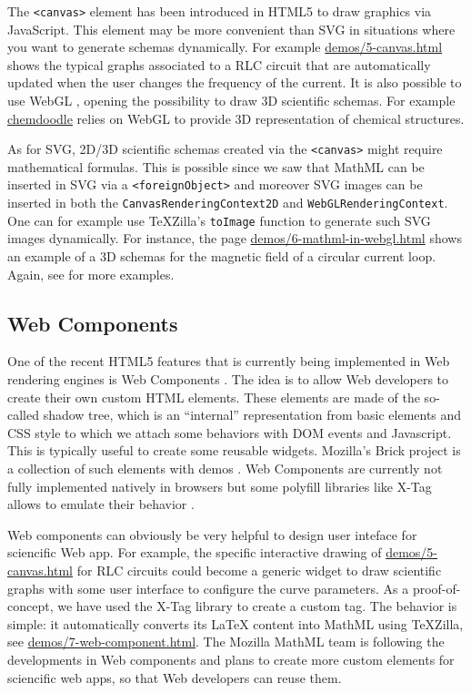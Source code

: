 The {\tt <canvas>} element has been introduced in HTML5 to draw graphics via
JavaScript. This element may be more convenient than SVG in situations where
you want to generate schemas dynamically. For example \href{http://fred-wang.github.io/MathUI2014/demos/5-canvas.html}{demos/5-canvas.html}
shows the typical graphs associated to a RLC circuit that are automatically
updated when the user changes the frequency of the current. It is also possible
to use WebGL \cite{WebGLspec},
opening the possibility to draw 3D scientific schemas. For example
\href{http://www.chemdoodle.com/}{chemdoodle}
relies on WebGL to provide 3D representation of chemical structures.

As for SVG, 2D/3D scientific schemas created via the {\tt <canvas>} might
require mathematical formulas. This is possible since we saw that MathML can be
inserted in SVG via a {\tt <foreignObject>} and moreover SVG images can be
inserted in both the {\tt CanvasRenderingContext2D} and
{\tt WebGLRenderingContext}. One
can for example use TeXZilla's {\tt toImage} function to generate such SVG
images dynamically. For instance,
the page \href{http://fred-wang.github.io/MathUI2014/demos/6-mathml-in-webgl.html}{demos/6-mathml-in-webgl.html} shows an
example of a 3D schemas for the magnetic field of a circular current loop.
Again, see \cite{MathInEbooks} for more examples.

\subsection{Web Components}
\label{sec:webcomponents}

One of the recent HTML5 features that is currently being implemented in Web
rendering engines is Web Components \cite{WebComponents}.
The idea is to allow Web developers to
create their own custom HTML elements. These elements are made of the so-called
shadow tree, which is an ``internal'' representation from basic elements and CSS
style to which we attach some behaviors with DOM events and Javascript. This is
typically useful to create some reusable widgets. Mozilla's Brick project
is a collection of such elements with demos \cite{Brick}.
Web Components are currently
not fully implemented natively in browsers but some polyfill libraries like
X-Tag allows to emulate their behavior \cite{XTag}.

Web components can obviously be very helpful to design user inteface for
sciencific Web app. For example, the specific interactive drawing of
\href{http://fred-wang.github.io/MathUI2014/demos/5-canvas.html}{demos/5-canvas.html} for RLC circuits could become a generic widget 
{\tt <x-graph>} to draw scientific graphs with some user interface to
configure the curve parameters. As a proof-of-concept, we have used the X-Tag
library to create a custom {\tt <x-tex>} tag. The behavior is simple: it
automatically converts its LaTeX content into MathML using TeXZilla, see
\href{http://fred-wang.github.io/MathUI2014/demos/7-web-component.html}{demos/7-web-component.html}.
The Mozilla MathML team is following the developments in Web components and
plans to create more custom elements for sciencific web apps, so that Web
developers can reuse them.
